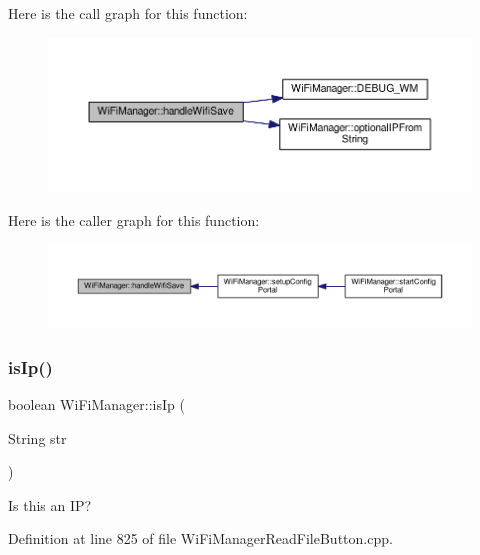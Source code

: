 Here is the call graph for this function\+:\nopagebreak
\begin{figure}[H]
\begin{center}
\leavevmode
\includegraphics[width=350pt]{class_wi_fi_manager_a2a8c2b60aa86dfdeab8a1a90f7122dc7_cgraph}
\end{center}
\end{figure}
Here is the caller graph for this function\+:\nopagebreak
\begin{figure}[H]
\begin{center}
\leavevmode
\includegraphics[width=350pt]{class_wi_fi_manager_a2a8c2b60aa86dfdeab8a1a90f7122dc7_icgraph}
\end{center}
\end{figure}
\mbox{\label{class_wi_fi_manager_a9c78a8774f746ec22a99d03a53baa607}} 
\subsubsection{\texorpdfstring{is\+Ip()}{isIp()}}
{\footnotesize\ttfamily boolean Wi\+Fi\+Manager\+::is\+Ip (\begin{DoxyParamCaption}\item[{String}]{str }\end{DoxyParamCaption})\hspace{0.3cm}{\ttfamily [private]}}

Is this an IP? 

Definition at line 825 of file Wi\+Fi\+Manager\+Read\+File\+Button.\+cpp.

